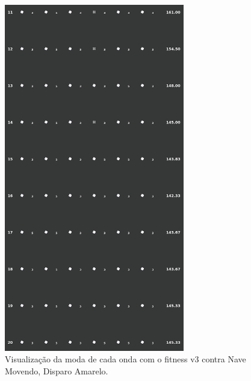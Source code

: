 \begin{figure}[H]
  \centering
  \includegraphics[width=0.7\textwidth]{figuras/ss/ss_yellowstill_ai_mode_2_2.png}
  \caption{Visualização da moda de cada onda com o fitness v3 contra Nave Movendo, Disparo Amarelo.}
  \label{fig:ss-moda-ym-2-2}
\end{figure}

